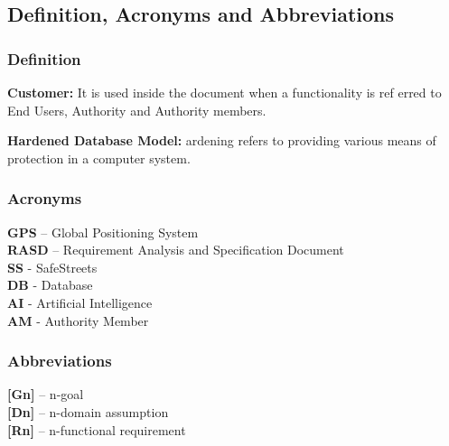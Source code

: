 \documentclass[12pt]{article}
\begin{document}
\subsection{Definition, Acronyms and Abbreviations}
\vspace{5mm}
\subsubsection{Definition}
\vspace{2mm}
\begin{flushleft}

\textbf{Customer:} It is used inside the document when a functionality is ref
erred to End Users, Authority and Authority members.
\vspace{2mm}

\textbf{Hardened Database Model:} ardening refers to providing various means of protection in a computer system. 

\end{flushleft}

\subsubsection{Acronyms}
\vspace{2mm}
\begin{flushleft}

\textbf{GPS} – Global Positioning System
\vspace{2mm}\\

\textbf{RASD} – Requirement Analysis and Specification Document 
\vspace{2mm}\\


\textbf{SS} - SafeStreets
\vspace{2mm}\\


\textbf{DB} - Database
\vspace{2mm}\\


\textbf{AI} - Artificial Intelligence
\vspace{2mm}\\

\textbf{AM} - Authority Member
\end{flushleft}

\newpage

\subsubsection{Abbreviations}
\vspace{2mm}
\begin{flushleft}

\textbf{[Gn]} – n-goal 
\vspace{2mm}\\
\textbf{[Dn]} – n-domain assumption 
\vspace{2mm}\\
\textbf{[Rn]} – n-functional requirement 
\vspace{2mm}\\

\end{flushleft}
\vspace{2mm}
\end{document}
